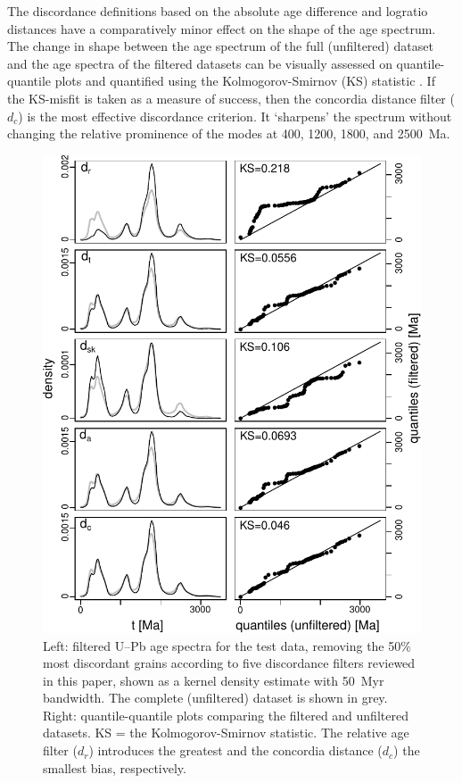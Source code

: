 \documentclass[gchron, manuscript]{copernicus}
\begin{document}
The discordance definitions based on the absolute age difference and
logratio distances have a comparatively minor effect on the shape of
the age spectrum. The change in shape between the age spectrum of the
full (unfiltered) dataset and the age spectra of the filtered datasets
can be visually assessed on quantile-quantile plots and quantified
using the Kolmogorov-Smirnov (KS) statistic \citep{vermeesch2013}.  If
the KS-misfit is taken as a measure of success, then the concordia
distance filter ($d_c$) is the most effective discordance
criterion. It `sharpens' the spectrum without changing the relative
prominence of the modes at 400, 1200, 1800, and 2500~Ma.

\begin{figure}[t]
  \includegraphics[width=12cm]{KDEs.pdf}
  \caption{Left: filtered U--Pb age spectra for the test data,
    removing the 50\% most discordant grains according to five
    discordance filters reviewed in this paper, shown as a kernel
    density estimate with 50~Myr bandwidth. The complete (unfiltered)
    dataset is shown in grey. Right: quantile-quantile plots comparing
    the filtered and unfiltered datasets. KS = the Kolmogorov-Smirnov
    statistic. The relative age filter ($d_r$) introduces the greatest
    and the concordia distance ($d_c$) the smallest bias,
    respectively.}
  \label{fig:KDEs}
\end{figure}
\end{document}
